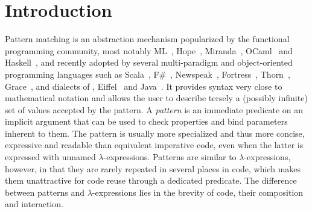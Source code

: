 \section{Introduction} %
\label{sec:intro}


Pattern matching is an abstraction mechanism popularized by the functional
programming community, most notably ML~\cite{ML78}, Hope~\cite{BMS80}, 
Miranda~\cite{Miranda85}, OCaml~\cite{OPM01} and Haskell~\cite{haskell90},
and recently adopted by several multi-paradigm and object-oriented programming 
languages such as Scala~\cite{Scala2nd}, F\#~\cite{Syme07}, 
Newspeak~\cite{geller2010pattern}, Fortress~\cite{RPS10}, 
Thorn~\cite{Thorn2012}, Grace~\cite{Grace2012}, and dialects of 
\Cpp{}\cite{Prop96,App}, Eiffel~\cite{Moreau:2003} and 
Java~\cite{Odersky97pizzainto,Liu03jmatch:iterable,HydroJ2003,OOMatch07thesis,padl08}.
It provides syntax very close to mathematical notation and allows the user to 
describe tersely a (possibly infinite) set of values accepted by the pattern. 
A \emph{pattern} is an immediate predicate on an implicit argument that can be 
used to check properties and bind parameters inherent to them. The pattern is 
usually more specialized and thus more concise, expressive and readable than 
equivalent imperative code, even when the latter is expressed with unnamed 
$\lambda$-expressions. Patterns are similar to $\lambda$-expressions, however, in 
that they are rarely repeated in several places in code, which makes them 
unattractive for code reuse through a dedicated predicate. The difference 
between patterns and $\lambda$-expressions lies in the brevity of code, their 
composition and interaction.

